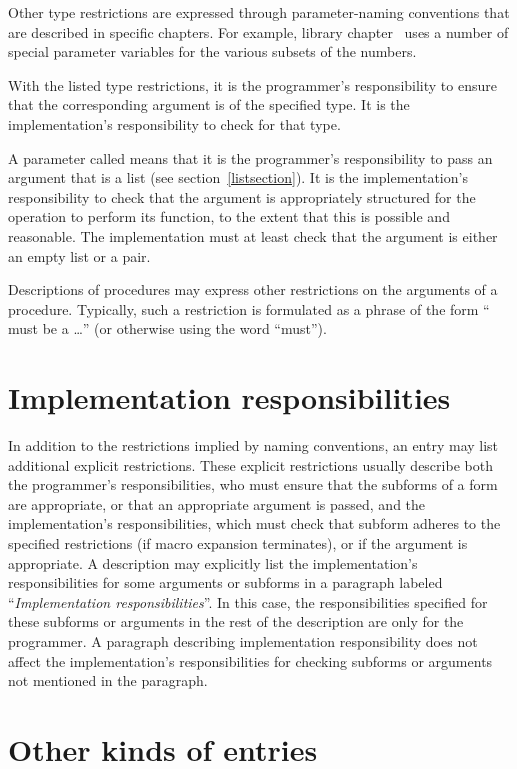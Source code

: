 Other type restrictions are expressed through parameter-naming
conventions that are described in specific chapters.  For example,
library chapter~ uses a number of special
parameter variables for the various subsets of the numbers.

With the listed type restrictions, it is the programmer's responsibility to
ensure that the corresponding argument is of the specified type.
It is the implementation's responsibility to check for
that type.

A parameter called  means that it is the
programmer's responsibility to pass an argument that is a list (see
section~\ref{listsection}).  It is the implementation's responsibility
to check that the argument is appropriately structured for the
operation to perform its function, to the extent that this is possible
and reasonable.  The implementation must at least check that the
argument is either an empty list or a pair.

Descriptions of procedures may express other restrictions on the
arguments of a procedure.  Typically, such a restriction is formulated
as a phrase of the form `` must be a \ldots'' (or otherwise
using the word ``must'').

\section{Implementation responsibilities}

In addition to the restrictions implied by naming conventions, an
entry may list additional explicit restrictions.
These explicit restrictions usually describe both the
programmer's responsibilities, who must ensure that the subforms of a
form are appropriate, or that an appropriate
argument is passed, and the implementation's responsibilities, which
must check that subform adheres to the specified restrictions (if
macro expansion terminates), or if the argument is appropriate.  A description
may explicitly list the implementation's responsibilities for some
arguments or subforms in a paragraph labeled ``\textit{Implementation
  responsibilities}''.  In this case, the responsibilities specified
for these subforms or arguments in the rest of the description are only for the
programmer.  A paragraph describing implementation responsibility does not
affect the implementation's responsibilities for checking subforms or arguments not
mentioned in the paragraph.

\section{Other kinds of entries}

